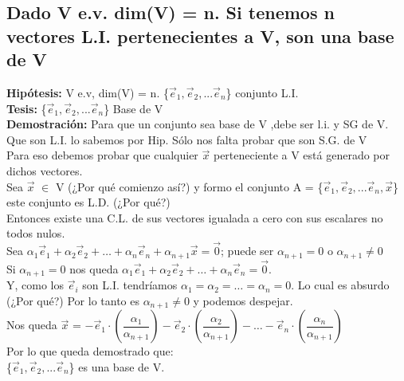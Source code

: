 \documentclass[11pt]{article}
\begin{document}
\subsection{Dado V e.v. dim(V) = n. Si tenemos n vectores L.I. pertenecientes a V, son una base de V}
{\bfseries {Hipótesis:}} V e.v, dim(V) = n. \{$\vec{e}_{1}, \vec{e}_2,... \vec{e}_n $\} conjunto L.I. \\
{\bfseries {Tesis:}} \{$\vec{e}_{1}, \vec{e}_2,... \vec{e}_n $\} Base de V\\
{\bfseries Demostración:} Para que un conjunto sea base de V ,debe ser l.i. y SG de V. \\
Que son L.I. lo sabemos por Hip. Sólo nos falta probar que son S.G. de V\\
Para eso debemos probar que cualquier $\vec{x}$ perteneciente a V está generado por dichos vectores. \\
Sea $\vec{x}$ $\in$ V (¿Por qué comienzo así?) y formo el conjunto A = \{$\vec{e}_{1}, \vec{e}_2,... \vec{e}_n, \vec{x} $\} este conjunto es L.D. (¿Por qué?)\\
Entonces existe una C.L. de sus vectores igualada a cero con sus escalares no todos nulos. \\
Sea $\alpha_1\vec{e}_1+\alpha_2\vec{e}_2+\hdots+\alpha_n\vec{e}_{n} + \alpha_{n+1}\vec{x} = \vec{0}$; puede ser $\alpha_{n+1} = 0$ o $\alpha_{n+1} \neq 0$\\
Si $\alpha_{n+1} = 0$ nos queda $\alpha_1\vec{e}_1+\alpha_2\vec{e}_2+\hdots+\alpha_n\vec{e}_{n}= \vec{0}$. 
\\Y, como los $\vec{e}_i$ son L.I. tendríamos $\alpha_1 = \alpha_2 = \hdots = \alpha_n = 0$. Lo cual es absurdo (¿Por qué?)
Por lo tanto es $\alpha_{n+1} \neq 0$ y podemos despejar.\\
Nos queda $\vec{x}$ = $-\vec{e}_1 \cdot (\dfrac{\alpha_1}{\alpha_{n+1}}) - \vec{e}_2 \cdot (\dfrac{\alpha_{2}}{\alpha_{n+1}}) - \hdots - \vec{e}_n \cdot (\dfrac{\alpha_n}{\alpha_{n+1}})$\\
Por lo que queda demostrado que: \\
\{$\vec{e}_{1}, \vec{e}_2,... \vec{e}_n $\} es una base de V.
\end{document}
